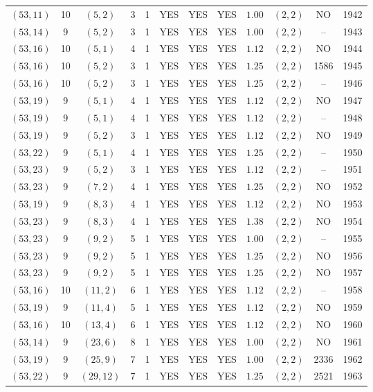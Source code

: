 \begin{longtable}{|c|c|c|c|c|c|c|c|c|c|c|c|}
$(53,11)$ & 10 & $(5,2)$ & 3 & 1 & YES & YES & YES & $1.00$ & $(2,2)$ & NO & 1942\\
$(53,14)$ & 9 & $(5,2)$ & 3 & 1 & YES & YES & YES & $1.00$ & $(2,2)$ & -- & 1943\\
$(53,16)$ & 10 & $(5,1)$ & 4 & 1 & YES & YES & YES & $1.12$ & $(2,2)$ & NO & 1944\\
$(53,16)$ & 10 & $(5,2)$ & 3 & 1 & YES & YES & YES & $1.25$ & $(2,2)$ & 1586 & 1945\\
$(53,16)$ & 10 & $(5,2)$ & 3 & 1 & YES & YES & YES & $1.25$ & $(2,2)$ & -- & 1946\\
$(53,19)$ & 9 & $(5,1)$ & 4 & 1 & YES & YES & YES & $1.12$ & $(2,2)$ & NO & 1947\\
$(53,19)$ & 9 & $(5,1)$ & 4 & 1 & YES & YES & YES & $1.12$ & $(2,2)$ & -- & 1948\\
$(53,19)$ & 9 & $(5,2)$ & 3 & 1 & YES & YES & YES & $1.12$ & $(2,2)$ & NO & 1949\\
$(53,22)$ & 9 & $(5,1)$ & 4 & 1 & YES & YES & YES & $1.25$ & $(2,2)$ & -- & 1950\\
$(53,23)$ & 9 & $(5,2)$ & 3 & 1 & YES & YES & YES & $1.12$ & $(2,2)$ & -- & 1951\\
$(53,23)$ & 9 & $(7,2)$ & 4 & 1 & YES & YES & YES & $1.25$ & $(2,2)$ & NO & 1952\\
$(53,19)$ & 9 & $(8,3)$ & 4 & 1 & YES & YES & YES & $1.12$ & $(2,2)$ & NO & 1953\\
$(53,23)$ & 9 & $(8,3)$ & 4 & 1 & YES & YES & YES & $1.38$ & $(2,2)$ & NO & 1954\\
$(53,23)$ & 9 & $(9,2)$ & 5 & 1 & YES & YES & YES & $1.00$ & $(2,2)$ & -- & 1955\\
$(53,23)$ & 9 & $(9,2)$ & 5 & 1 & YES & YES & YES & $1.25$ & $(2,2)$ & NO & 1956\\
$(53,23)$ & 9 & $(9,2)$ & 5 & 1 & YES & YES & YES & $1.25$ & $(2,2)$ & NO & 1957\\
$(53,16)$ & 10 & $(11,2)$ & 6 & 1 & YES & YES & YES & $1.12$ & $(2,2)$ & -- & 1958\\
$(53,19)$ & 9 & $(11,4)$ & 5 & 1 & YES & YES & YES & $1.12$ & $(2,2)$ & NO & 1959\\
$(53,16)$ & 10 & $(13,4)$ & 6 & 1 & YES & YES & YES & $1.12$ & $(2,2)$ & NO & 1960\\
$(53,14)$ & 9 & $(23,6)$ & 8 & 1 & YES & YES & YES & $1.00$ & $(2,2)$ & NO & 1961\\
$(53,19)$ & 9 & $(25,9)$ & 7 & 1 & YES & YES & YES & $1.00$ & $(2,2)$ & 2336 & 1962\\
$(53,22)$ & 9 & $(29,12)$ & 7 & 1 & YES & YES & YES & $1.25$ & $(2,2)$ & 2521 & 1963\\

\end{longtable}
